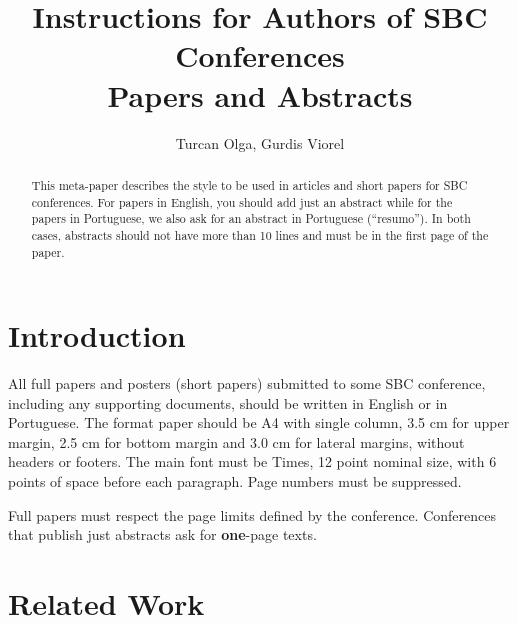 \documentclass[12pt]{article}
\title{Instructions for Authors of SBC Conferences\\ Papers and Abstracts}
\author{Turcan Olga, Gurdis Viorel}
\begin{document}
 

\maketitle

\begin{abstract}
  This meta-paper describes the style to be used in articles and short papers
  for SBC conferences. For papers in English, you should add just an abstract
  while for the papers in Portuguese, we also ask for an abstract in
  Portuguese (``resumo''). In both cases, abstracts should not have more than
  10 lines and must be in the first page of the paper.
\end{abstract}


\section{Introduction}

All full papers and posters (short papers) submitted to some SBC conference,
including any supporting documents, should be written in English or in
Portuguese. The format paper should be A4 with single column, 3.5 cm for upper
margin, 2.5 cm for bottom margin and 3.0 cm for lateral margins, without
headers or footers. The main font must be Times, 12 point nominal size, with 6
points of space before each paragraph. Page numbers must be suppressed.

Full papers must respect the page limits defined by the conference.
Conferences that publish just abstracts ask for \textbf{one}-page texts.

\section{Related Work} \label{sec:firstpage}
\end{document}

